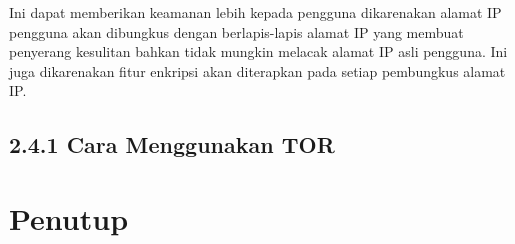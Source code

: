 \documentclass{article}
\begin{document}
        Ini dapat memberikan keamanan lebih kepada pengguna dikarenakan alamat IP pengguna
        akan dibungkus dengan berlapis-lapis alamat IP yang membuat penyerang kesulitan bahkan
        tidak mungkin melacak alamat IP asli pengguna. Ini juga dikarenakan fitur enkripsi
        akan diterapkan pada setiap pembungkus alamat IP.
        \subsection*{2.4.1 Cara Menggunakan TOR}
        
        \section{Penutup}
        
\end{document}
